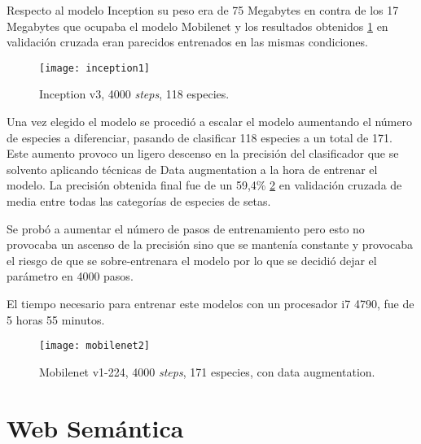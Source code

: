 Respecto al modelo Inception su peso era de 75 Megabytes en contra de los 17 Megabytes que ocupaba el modelo Mobilenet y los resultados obtenidos \ref{figInception1} en validación cruzada eran parecidos entrenados en las mismas condiciones. 

\begin{figure}[h]
    \begin{center}%
        \begin{center}%
          \texttt{[image: inception1]}%
          \caption{Inception v3, 4000 \textit{steps}, 118 especies.}%
          \label{figInception1}%
        \end{center}%
  	\end{center}%
\end{figure}%

Una vez elegido el modelo se procedió a escalar el modelo aumentando el número de especies a diferenciar, pasando de clasificar 118 especies a un total de 171. Este aumento provoco un ligero descenso en la precisión del clasificador que se solvento aplicando técnicas de Data augmentation a la hora de entrenar el modelo. La precisión obtenida final fue de un 59,4\% \ref{figMobilenet2} en validación cruzada de media entre todas las categorías de especies de setas.

Se probó a aumentar el número de pasos de entrenamiento pero esto no provocaba un ascenso de la precisión sino que se mantenía constante y provocaba el riesgo de que se sobre-entrenara el modelo por lo que se decidió dejar el parámetro en 4000 pasos.

El tiempo necesario para entrenar este modelos con un procesador i7 4790, fue de 5 horas 55 minutos.

\begin{figure}[h]
    \begin{center}%
        \begin{center}%
          \texttt{[image: mobilenet2]}%
          \caption[Mobilenet v1-224, 4000 \textit{steps}, 171 especies]{Mobilenet v1-224, 4000 \textit{steps}, 171 especies, con data augmentation.}%
          \label{figMobilenet2}%
        \end{center}%
  	\end{center}%
\end{figure}%

\section{Web Semántica}

